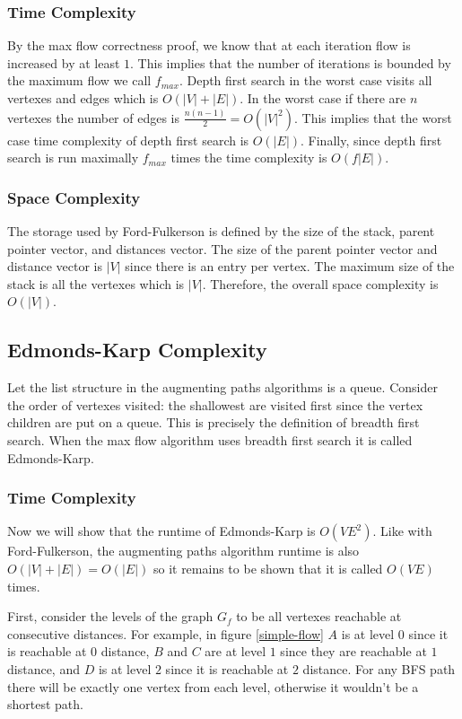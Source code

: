 \documentclass{article}
\begin{document}
\subsubsection{Time Complexity}
By the max flow correctness proof, we know that at each iteration flow is increased by at least $1$. This implies that the number of iterations is bounded by the maximum flow we call $f_{max}$. Depth first search in the worst case visits all vertexes and edges which is $O(|V|+|E|)$. In the worst case if there are $n$ vertexes the number of edges is $\frac{n(n-1)}{2}=O(|V|^2)$. This implies that the worst case time complexity of depth first search is $O(|E|)$. Finally, since depth first search is run maximally $f_{max}$ times the time complexity is $O(f|E|)$.

\subsubsection{Space Complexity}
The storage used by Ford-Fulkerson is defined by the size of the stack, parent pointer vector, and distances vector. The size of the parent pointer vector and distance vector is $|V|$ since there is an entry per vertex. The maximum size of the stack is all the vertexes which is $|V|$. Therefore, the overall space complexity is $O(|V|)$.

\subsection{Edmonds-Karp Complexity}
Let the list structure in the augmenting paths algorithms is a queue. Consider the order of vertexes visited: the shallowest are visited first since the vertex children are put on a queue. This is precisely the definition of breadth first search. When the max flow algorithm uses breadth first search it is called Edmonds-Karp.

\subsubsection{Time Complexity}
Now we will show that the runtime of Edmonds-Karp is $O(VE^2)$. Like with Ford-Fulkerson, the augmenting paths algorithm runtime is also $O(|V|+|E|)=O(|E|)$ so it remains to be shown that it is called $O(VE)$ times.

First, consider the levels of the graph $G_f$ to be all vertexes reachable at consecutive distances. For example, in figure \ref{simple-flow} $A$ is at level $0$ since it is reachable at $0$ distance, $B$ and $C$ are at level $1$ since they are reachable at $1$ distance, and $D$ is at level $2$ since it is reachable at $2$ distance. For any BFS path there will be exactly one vertex from each level, otherwise it wouldn't be a shortest path.
\end{document}
